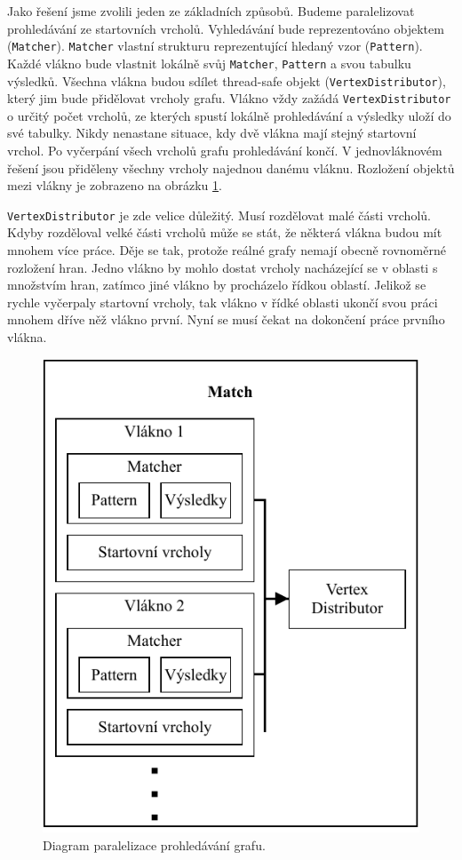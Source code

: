 Jako řešení jsme zvolili jeden ze základních způsobů.
Budeme paralelizovat prohledávání ze startovních vrcholů.
Vyhledávání bude reprezentováno objektem (\texttt{Matcher}).
\texttt{Matcher} vlastní strukturu reprezentující hledaný vzor (\texttt{Pattern}).
Každé vlákno bude vlastnit lokálně svůj \texttt{Matcher}, \texttt{Pattern} a svou tabulku výsledků.
Všechna vlákna budou sdílet thread-safe objekt (\texttt{VertexDistributor}), který jim bude přidělovat vrcholy grafu.
Vlákno vždy zažádá \texttt{VertexDistributor} o určitý počet vrcholů, ze kterých spustí lokálně prohledávání a výsledky uloží do své tabulky.
Nikdy nenastane situace, kdy dvě vlákna mají stejný startovní vrchol.
Po vyčerpání všech vrcholů grafu prohledávání končí.
V jednovláknovém řešení jsou přiděleny všechny vrcholy najednou danému vláknu. 
Rozložení objektů mezi vlákny je zobrazeno na obrázku \ref{figure.diaQueryObjectsMatchPar}. 

\texttt{VertexDistributor} je zde velice důležitý.
Musí rozdělovat malé části vrcholů.
Kdyby rozděloval velké části vrcholů může se stát, že některá vlákna budou mít mnohem více práce.
Děje se tak, protože reálné grafy nemají obecně rovnoměrné rozložení hran.
Jedno vlákno by mohlo dostat vrcholy nacházející se v oblasti s množstvím hran, zatímco jiné vlákno by procházelo řídkou oblastí.
Jelikož se rychle vyčerpaly startovní vrcholy, tak vlákno v řídké oblasti ukončí svou práci mnohem dříve něž vlákno první.
Nyní se musí čekat na dokončení práce prvního vlákna.
\clearpage
\begin{figure}[!htp]
\includegraphics{../img/diaQueryObjectsMatchPar.pdf}\centering
\caption{Diagram paralelizace prohledávání grafu.}
\label{figure.diaQueryObjectsMatchPar}
\end{figure}

